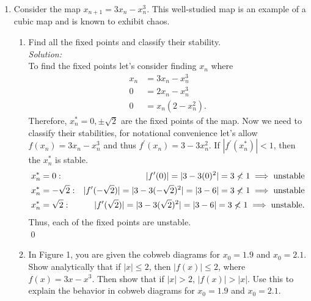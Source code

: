 \documentclass[10pt]{amsart}
\theoremstyle{nonumberplain}
\begin{document}
\begin{enumerate}[label={\bf {\arabic*}:}]
\begin{enumerate}
\end{enumerate}

\item Consider the map $x_{n + 1} = 3x_n - x_n^3$.
This well-studied map is an example of a cubic map and is known to exhibit chaos. \\
\begin{enumerate}

\item Find all the fixed points and classify their stability. \\

\textit{Solution:} \\
To find the fixed points let's consider finding $x_n$ where
\begin{align*}
x_n &= 3x_n - x_n^3 \\
0 &= 2x_n - x_n^3 \\
0 &= x_n (2 - x_n^2).
\end{align*}
Therefore, $x_n^* = 0, \pm \sqrt{2}$ are the fixed points of the map.
Now we need to classify their stabilities, for notational convenience let's allow $f(x_n) = 3x_n - x_n^3$ and thus $f^\prime(x_n) = 3 -3x_n^2$.
If $|f^\prime(x_n^*)| < 1$, then the $x_n^*$ is stable.
\begin{align*}
x_n^* &= 0:& |f^\prime(0)| = |3 -3(0)^2| = 3 \not < 1 \implies {\rm unstable} \\
x_n^* &= -\sqrt 2:& |f^\prime(-\sqrt 2)| = |3 -3(-\sqrt 2)^2| = |3 -6| = 3 \not < 1 \implies {\rm unstable} \\
x_n^* &= \sqrt 2:& |f^\prime(\sqrt 2)| = |3 -3(\sqrt 2)^2| = |3 -6| = 3 \not < 1 \implies {\rm unstable}.
\end{align*}
Thus, each of the fixed points are unstable. \\
\qed \\

\item In Figure 1, you are given the cobweb diagrams for $x_0 = 1.9$ and $x_0 = 2.1$.
Show analytically that if $|x| \leq 2$, then $|f(x)| \leq 2$, where $f(x) = 3x - x^3$.
Then show that if $|x| > 2$, $|f(x)| > |x|$.
Use this to explain the behavior in cobweb diagrams for $x_0 = 1.9$ and $x_0 = 2.1$.  \\


\end{enumerate}
\end{enumerate}
\end{document}
